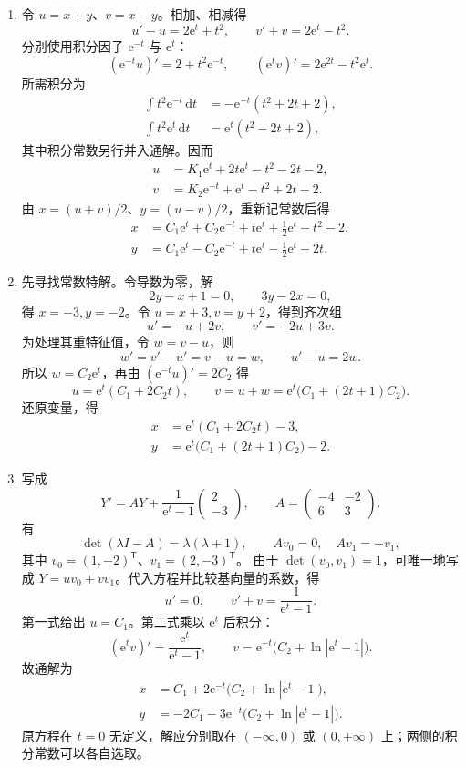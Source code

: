 \documentclass[UTF8,a4paper,11pt]{ctexart}
\newcommand{\dd}{\,\mathrm d}
\newcommand{\e}{\mathrm e}
\begin{document}
\begin{solution}
\begin{enumerate}[label=(\arabic*)]
\item 令 $u=x+y$、$v=x-y$。相加、相减得
\[
u'-u=2\e^t+t^2,\qquad v'+v=2\e^t-t^2.
\]
分别使用积分因子 $\e^{-t}$ 与 $\e^t$：
\[
(\e^{-t}u)'=2+t^2\e^{-t},\qquad
(\e^t v)'=2\e^{2t}-t^2\e^t.
\]
所需积分为
\[
\begin{aligned}
\int t^2\e^{-t}\dd t&=-\e^{-t}(t^2+2t+2),\\
\int t^2\e^t\dd t&=\e^t(t^2-2t+2),
\end{aligned}
\]
其中积分常数另行并入通解。因而
\[
\begin{aligned}
u&=K_1\e^t+2t\e^t-t^2-2t-2,\\
v&=K_2\e^{-t}+\e^t-t^2+2t-2.
\end{aligned}
\]
由 $x=(u+v)/2$、$y=(u-v)/2$，重新记常数后得
\[
\boxed{
\begin{aligned}
x&=C_1\e^t+C_2\e^{-t}+t\e^t+\tfrac12\e^t-t^2-2,\\
y&=C_1\e^t-C_2\e^{-t}+t\e^t-\tfrac12\e^t-2t.
\end{aligned}}
\]

\item 先寻找常数特解。令导数为零，解
\[
2y-x+1=0,\qquad 3y-2x=0,
\]
得 $x=-3,y=-2$。令 $u=x+3,v=y+2$，得到齐次组
\[
u'=-u+2v,\qquad v'=-2u+3v.
\]
为处理其重特征值，令 $w=v-u$，则
\[
w'=v'-u'=v-u=w,\qquad u'-u=2w.
\]
所以 $w=C_2\e^t$，再由 $(\e^{-t}u)'=2C_2$ 得
\[
u=\e^t(C_1+2C_2t),\qquad
v=u+w=\e^t\bigl(C_1+(2t+1)C_2\bigr).
\]
还原变量，得
\[
\boxed{
\begin{aligned}
x&=\e^t(C_1+2C_2t)-3,\\
y&=\e^t\bigl(C_1+(2t+1)C_2\bigr)-2.
\end{aligned}}
\]

\item 写成
\[
Y'=AY+\frac1{\e^t-1}\begin{pmatrix}2\\-3\end{pmatrix},\qquad
A=\begin{pmatrix}-4&-2\\6&3\end{pmatrix}.
\]
有
\[
\det(\lambda I-A)=\lambda(\lambda+1),\qquad
Av_0=0,\quad Av_1=-v_1,
\]
其中 $v_0=(1,-2)^{\mathsf T}$、$v_1=(2,-3)^{\mathsf T}$。
由于 $\det(v_0,v_1)=1$，可唯一地写成 $Y=uv_0+vv_1$。代入方程并比较基向量的系数，得
\[
u'=0,\qquad v'+v=\frac1{\e^t-1}.
\]
第一式给出 $u=C_1$。第二式乘以 $\e^t$ 后积分：
\[
(\e^t v)'=\frac{\e^t}{\e^t-1},\qquad
v=\e^{-t}\bigl(C_2+\ln|\e^t-1|\bigr).
\]
故通解为
\[
\boxed{
\begin{aligned}
x&=C_1+2\e^{-t}\bigl(C_2+\ln|\e^t-1|\bigr),\\
y&=-2C_1-3\e^{-t}\bigl(C_2+\ln|\e^t-1|\bigr).
\end{aligned}}
\]
原方程在 $t=0$ 无定义，解应分别取在 $(-\infty,0)$ 或 $(0,+\infty)$ 上；两侧的积分常数可以各自选取。
\end{enumerate}
\end{solution}
\end{document}
